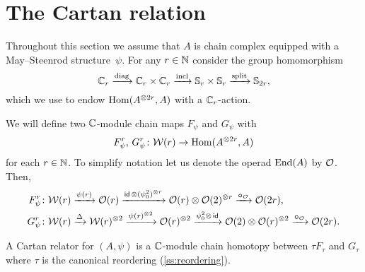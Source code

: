 
\section{The Cartan relation}\label{s:cartan}

Throughout this section we assume that $A$ is chain complex equipped with a May--Steenrod structure~$\psi$.
For any $r \in \mathbb{N}$ consider the group homomorphism
\begin{equation}\label{eq:cyclic to 2-symetric}
	\mathbb{C}_r \xrightarrow{\mathrm{diag}} \mathbb{C}_r \times \mathbb{C}_r \xrightarrow{\mathrm{incl}} \mathbb{S}_r \times \mathbb{S}_r \xrightarrow{\mathrm{split}} \mathbb{S}_{2r},
\end{equation}
which we use to endow $\mathrm{Hom}(A^{\otimes 2r}, A)$ with a $\mathbb{C}_r$-action.

We will define two $\mathbb{C}$-module chain maps $F_\psi$ and $G_\psi$ with
\[
F_\psi^r,\, G_\psi^r \colon \mathcal{W}(r) \to \mathrm{Hom}(A^{\otimes 2r}, A)
\]
for each $r \in \mathbb{N}$.
To simplify notation let us denote the operad $\mathrm{End}(A)$ by $\mathcal{O}$.
Then,
\begin{align*}
	F_\psi^r \colon& \mathcal{W}(r) \xrightarrow{\psi(r)} \mathcal{O}(r) \xrightarrow{\mathsf{id}\, \otimes (\psi_0^2)^{\otimes r}}
	\mathcal{O}(r) \otimes \mathcal{O}(2)^{\otimes r} \xrightarrow{\bm{\circ}_{\mathcal{O}}}
	\mathcal{O}(2r), \\
	G_\psi^r \colon& \mathcal{W}(r) \xrightarrow{\Delta}
	\mathcal{W}(r)^{\otimes 2} \xrightarrow{\psi(r)^{\otimes 2}}
	\mathcal{O}(r)^{\otimes 2} \xrightarrow{\psi_0^2 \otimes\, \mathsf{id}}
	\mathcal{O}(2) \otimes \mathcal{O}(r)^{\otimes 2} \xrightarrow{\bm{\circ}_{\mathcal{O}}}
	\mathcal{O}(2r).
\end{align*}

\begin{definition}
	A Cartan relator for $(A, \psi)$ is a $\mathbb{C}$-module chain homotopy between $\tau F_\tau$ and $G_\tau$ where $\tau$ is the canonical reordering (\cref{ss:reordering}).
\end{definition}

